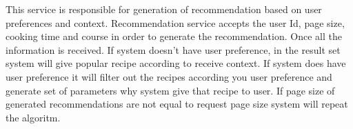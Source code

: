 This service is responsible for generation of recommendation based on user preferences and context.  Recommendation service accepts the user Id, page size, cooking time and course in order to generate the recommendation. Once all the information is received. If system doesn’t have user preference, in the result set system will give popular recipe according to receive context. If system does have user preference it will filter out the recipes according you user preference and generate set of parameters why system give that recipe to user. If page size of generated recommendations are not equal to request page size system will repeat the algoritm. 
	